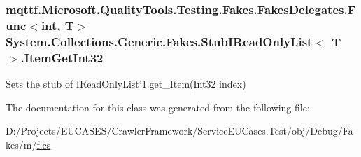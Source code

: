 \hypertarget{class_system_1_1_collections_1_1_generic_1_1_fakes_1_1_stub_i_read_only_list_3_01_t_01_4_a48b8d9688254896b8c9bd82138e89f12}{
\subsubsection[{Item\-Get\-Int32}]{\setlength{\rightskip}{0pt plus 5cm}mqttf.\-Microsoft.\-Quality\-Tools.\-Testing.\-Fakes.\-Fakes\-Delegates.\-Func$<$int, T$>$ System.\-Collections.\-Generic.\-Fakes.\-Stub\-I\-Read\-Only\-List$<$ T $>$.Item\-Get\-Int32}}\label{class_system_1_1_collections_1_1_generic_1_1_fakes_1_1_stub_i_read_only_list_3_01_t_01_4_a48b8d9688254896b8c9bd82138e89f12}


Sets the stub of I\-Read\-Only\-List`1.get\-\_\-\-Item(\-Int32 index)



The documentation for this class was generated from the following file\-:\begin{DoxyCompactItemize}
\item 
D\-:/\-Projects/\-E\-U\-C\-A\-S\-E\-S/\-Crawler\-Framework/\-Service\-E\-U\-Cases.\-Test/obj/\-Debug/\-Fakes/m/\hyperlink{m_2f_8cs}{f.\-cs}\end{DoxyCompactItemize}
